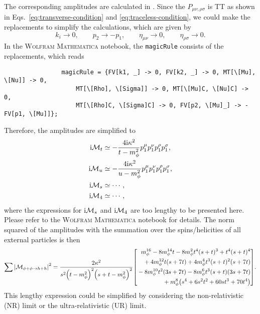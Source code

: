 \documentclass{article}
\begin{document}
            The corresponding amplitudes are calculated in .
            Since the $P_{\mu\nu, \rho\sigma}$ is TT as shown in Eqs.~\eqref{eq:transverse-condition} and \eqref{eq:traceless-condition}, we could make the replacements to simplify the calculations, which are given by
            \begin{equation}
                    k_i \to 0, \qquad p_2 \to -p_1, \qquad \eta_{\mu\nu} \to 0, \qquad \eta_{\rho\sigma} \to 0.
            \end{equation}
            In the \textsc{Wolfram Mathematica} notebook, the \texttt{magicRule} consists of the replacements, which reads
            \begin{verbatim}
                magicRule = {FV[k1, _] -> 0, FV[k2, _] -> 0, MT[\[Mu], \[Nu]] -> 0, 
                    MT[\[Rho], \[Sigma]] -> 0, MT[\[Mu]C, \[Nu]C] -> 0, 
                    MT[\[Rho]C, \[Sigma]C] -> 0, FV[p2, \[Mu]_] -> -FV[p1, \[Mu]]};
            \end{verbatim}
            Therefore, the amplitudes are simplified to
            \begin{align}
                \iM[t] & \simeq -\frac{4 \ii \kappa^2}{t - m_\phi^2} p_1^\mu p_1^\nu p_1^\rho p_1^\sigma, \\
                \iM[u] & \simeq -\frac{4 \ii \kappa^2}{u - m_\phi^2} p_1^\mu p_1^\nu p_1^\rho p_1^\sigma, \\
                \iM[s] & \simeq \cdots, \\
                \iM[4] & \simeq \cdots,
            \end{align}
            where the expressions for $\iM[s]$ and $\iM[4]$ are too lengthy to be presented here.
            Please refer to the \textsc{Wolfram Mathematica} notebook for details.
            The norm squared of the amplitudes with the summation over the spins/helicities of all external particles is then
            \begin{equation}
                \sumMsqr[\phi + \phi \to h + h] = \frac{2 \kappa^2}{s^2 \qty(t - m_\phi^2)^2 \qty(s + t - m_\phi^2)^2} \qty[
                    \begin{aligned}
                        m_\phi^{16} - 8 m_\phi^{14} t - 8 m_\phi^2 t^4 (s + t)^3 + t^4 (s + t)^4 \\
                        {} + 4 m_\phi^{12} t (s + 7 t) + 4 m_\phi^4 t^3 (s + t)^2 (s + 7 t) \\
                        {} - 8 m_\phi^{10} t^2 (3 s + 7 t) - 8 m_\phi^6 t^3 (s + t) (3 s + 7 t) \\
                        {} + m_\phi^8 \qty(s^4 + 6 s^2 t^2 + 60 s t^3 + 70 t^4)
                    \end{aligned}
                ].
            \end{equation}
            This lengthy expression could be simplified by considering the non-relativistic (NR) limit or the ultra-relativistic (UR) limit.
\end{document}
